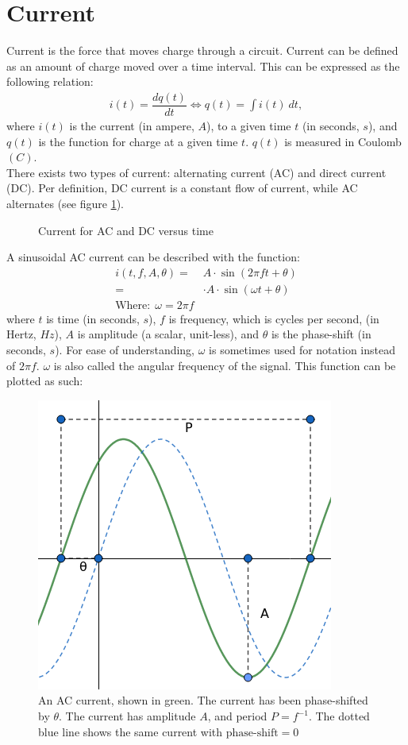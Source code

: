 \section{Current}
Current is the force that moves charge through a circuit. Current can be defined as an amount of charge moved over a time interval. This can be expressed as the following relation:
\begin{align}
i(t)=\dfrac{dq(t)}{dt} \Leftrightarrow q(t)=\int i(t)\ dt,
\label{I=dq/dt}
\end{align}
where $i(t)$ is the current (in ampere, $A$), to a given time $t$ (in seconds, $s$), and $q(t)$ is the function for charge at a given time $t$. $q(t)$ is measured in Coulomb $(C)$.
\\
There exists two types of current: alternating current (AC) and direct current (DC). Per definition, DC current is a constant flow of current, while AC alternates (see figure \ref{fig:ACDC}). 
\begin{figure}[H] 

\caption{Current for AC and DC versus time}
\label{fig:ACDC}
\end{figure}
A sinusoidal AC current can be described with the function: 
\begin{align}
i(t, f, A, \theta) =& A\cdot \sin{(2\pi ft + \theta)} \nonumber
\\
=& \cdot A \cdot \sin{(\omega t + \theta)} \nonumber
\\
\text{Where:}~~\omega=2\pi f \label{eq:omega}
\end{align}
where $t$ is time (in seconds, $s$), $f$ is frequency, which is cycles per second, (in Hertz, $Hz$), $A$ is amplitude (a scalar, unit-less), and $\theta$ is the phase-shift (in seconds, $s$).
For ease of understanding, $\omega$ is sometimes used for notation instead of $2\pi f$. $\omega$ is also called the angular frequency of the signal.
This function can be plotted as such:
\begin{figure}[H]
	\centering
	\includegraphics[scale=0.7]{fig/img/AC.png}
	\caption{An AC current, shown in green. The current has been phase-shifted by $\theta$. The current has amplitude $A$, and period $P=f^{-1}$. The dotted blue line shows the same current with $\text{phase-shift} =0$}
\end{figure}


